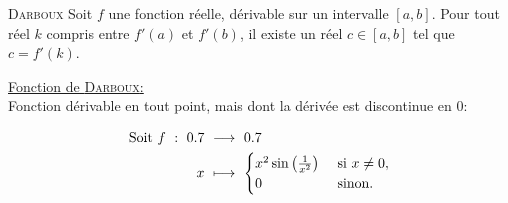 \begin{theo}{\textsc{Darboux}}
    Soit $f$ une fonction réelle, dérivable sur un intervalle $[a, b]$. Pour tout réel $k$ compris entre $f'(a)$ et $f'(b)$, il existe un réel $c \in [a, b]$ tel que $c = f'(k)$.
\end{theo}

\underline{Fonction de \textsc{Darboux}:} \\
Fonction dérivable en tout point, mais dont la dérivée est discontinue en $0$:

\begin{alignat*}{2}
    \text{Soit } f\ :\ \R\ &\longrightarrow\ \R\\
    x\ &\longmapsto\ 
    \begin{cases}
        x^2 \sin \left( \frac{1}{x^2} \right) &\text{ si } x \not= 0,\\
        0 &\text{ sinon}.
    \end{cases}
\end{alignat*}